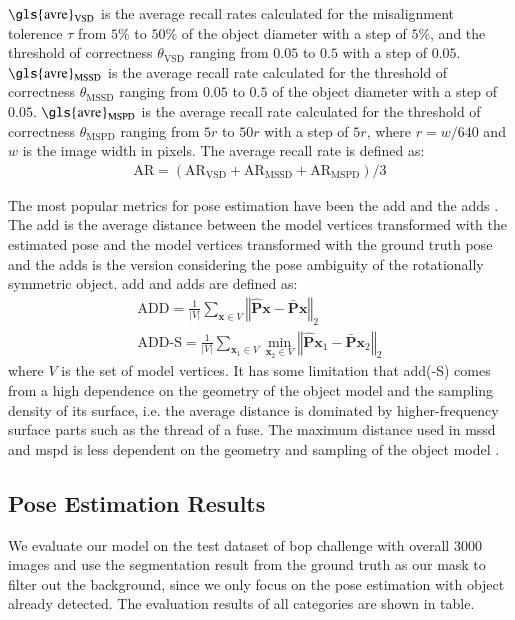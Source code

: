 \documentclass[12pt,DIV14,BCOR12mm,a4paper,footinclude=false,headinclude,parskip=half-,twoside,openright,cleardoublepage=empty,toc=index,bibliography=totoc,listof=totoc]{scrreprt}
\numberwithin{equation}{chapter}
\begin{document}
$\text{\gls{avre}}_{\text{VSD}}$ is the average recall rates calculated for the misalignment tolerence $\tau$ from $5\%$ to $50\%$ of the object diameter with a step of $5\%$, and the threshold of correctness $\theta_{\text{VSD}}$ ranging from $0.05$ to $0.5$ with a step of $0.05$. $\text{\gls{avre}}_{\text{MSSD}}$ is the average recall rate calculated for the threshold of correctness $\theta_{\text{MSSD}}$ ranging from $0.05$ to $0.5$ of the object diameter with a step of $0.05$. $\text{\gls{avre}}_{\text{MSPD}}$ is the average recall rate calculated for the threshold of correctness $\theta_{\text{MSPD}}$ ranging from $5r$ to $50r$ with a step of $5r$, where $r=w/640$ and $w$ is the image width in pixels. The average recall rate is defined as:
\begin{align}
  \text{AR}=\left(\text{AR}_{\text{VSD}}+\text{AR}_{\text{MSSD}}+\text{AR}_{\text{MSPD}}\right)/3
\end{align}

The most popular metrics for pose estimation have been the \gls{add} and the \gls{adds} \cite{hinterstoisser2012model}. The \gls{add} is the average distance between the model vertices transformed with the estimated pose and the model vertices transformed with the ground truth pose and the \gls{adds} is the version considering the pose ambiguity of the rotationally symmetric object. \gls{add} and \gls{adds} are defined as:
\begin{gather}
  \text{ADD}=\frac{1}{\left|V\right|}\sum_{\mathbf{x}\in V}\left\Vert \hat{\mathbf{P}}\mathbf{x}-\bar{\mathbf{P}}\mathbf{x}\right\Vert _{2}\\
  \text{ADD-S}=\frac{1}{\left|V\right|}\sum_{\mathbf{x}_{1}\in V}\min_{\mathbf{x}_{2}\in V}\left\Vert \hat{\mathbf{P}}\mathbf{x}_{1}-\bar{\mathbf{P}}\mathbf{x}_{2}\right\Vert _{2}
\end{gather}
where $V$ is the set of model vertices. It has some limitation that \gls{add}(-S) comes from a high dependence on the geometry of the object model and the sampling density of its surface, i.e. the average distance is dominated by higher-frequency surface parts such as the thread of a fuse. The maximum distance used in \gls{mssd} and \gls{mspd} is less dependent on the geometry and sampling of the object model \cite{hodan2020bop}.

\subsection{Pose Estimation Results}
We evaluate our model on the test dataset of \gls{bop} challenge \cite{hodan2018bop} with overall 3000 images and use the segmentation result from the ground truth as our mask to filter out the background, since we only focus on the pose estimation with object already detected. The evaluation results of all categories are shown in table.
\end{document}
